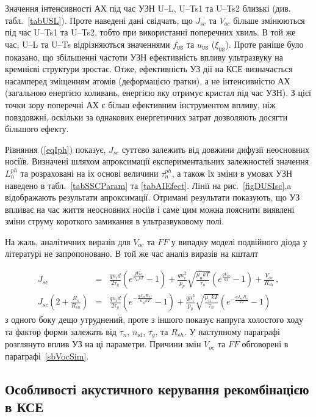 Значення інтенсивності АХ під час УЗН U--L, U--Ts1 та U--Ts2 близькі (див. табл.~\ref{tabUSL}).
Проте наведені дані свідчать, що $J_{sc}$ та $V_{oc}$ більше змінюються під час U--Ts1 та U--Ts2, тобто при використанні поперечних хвиль.
В той же час, U--L та U--Ts відрізняються значеннями $f_\mathtt{US}$ та $u_\mathtt{US}$ ($\xi_\mathtt{US}$).
Проте раніше \cite{Olikh:FTP2011,Olikh:Ultras2016} було показано, що збільшенні частоти УЗН ефективність впливу ультразвуку
на кремнієві структури зростає.
Отже, ефективність УЗ дії на КСЕ визначається насамперед зміщенням атомів (деформацією ґратки),
а не інтенсивністю АХ (загальною енергією коливань, енергією яку отримує кристал під час УЗН).
З цієї точки зору поперечні АХ є більш ефективним інструментом впливу, ніж повздовжні,
оскільки за однакових енергетичних затрат дозволяють досягти більшого ефекту.

Рівняння (\ref{eqIph}) показує, $J_{sc}$ суттєво залежить від довжини дифузії неосновних носіїв.
Визначені шляхом апроксимації експериментальних залежностей значення $L_n^{ph}$ та розраховані на їх основі величини $\tau_n^{ph}$,
а також їх зміни в умовах УЗН наведено в табл.~\ref{tabSSCParam} та \ref{tabAIEfect}.
Лінії на рис.~\ref{figDUSIsc},a відображають результати апроксимації.
Отримані результати показують, що УЗ впливає на час життя неосновних носіїв і саме цим можна пояснити виявлені зміни струму короткого замикання в ультразвуковому полі.

На жаль, аналітичних виразів для $V_{oc}$ та $F\!F$ у випадку моделі подвійного діода у літературі не запропоновано.
В той же час аналіз виразів на кшталт

\begin{eqnarray}
\label{eqSSCVoc}
 J_{sc}&=&\frac{qn_id}{2\tau_{g}}\left(e^{\frac{qV_{oc}}{n_\mathrm{id}kT}}-1\right)
+\frac{qn_i^2}{p_p}\sqrt{\frac{\mu_nkT}{\tau_n}}\left(e^{\frac{qV_{oc}}{kT}}-1\right)+\frac{V_{oc}}{R_{sh}}\,,\\
J_{sc}\left(2+\frac{R_s}{R_{sh}}\right)&=&\frac{qn_id}{2\tau_{g}}\left(e^{-\frac{qJ_{sc}R_s)}{n_\mathrm{id}kT}}-1\right)
+\frac{qn_i^2}{p_p}\sqrt{\frac{\mu_nkT}{\tau_n}}\left(e^{-\frac{qJ_{sc}R_s}{kT}}-1\right)
\end{eqnarray}
з одного боку дещо утруднений, проте з іншого показує напруга холостого ходу та фактор форми
залежать від $\tau_n$, $n_\mathrm{id}$, $\tau_g$, та $R_{sh}$.
У наступному параграфі розглянуто вплив УЗ на ці параметри.
Причини змін $V_{oc}$ та  $F\!F$ обговорені в параграфі~\ref{sbVocSim}.


\subsection{Особливості акустичного керування рекомбінацією в КСЕ\label{sbQNR}}


